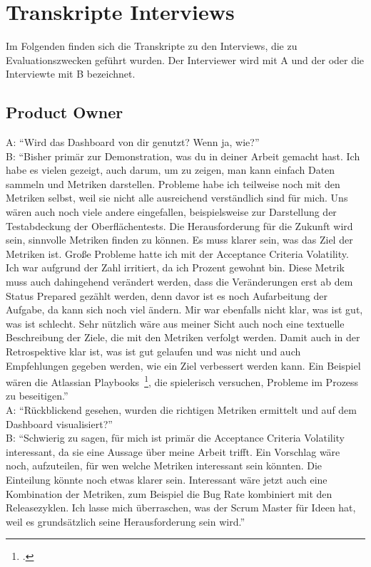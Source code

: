 \newpage
\section{Transkripte Interviews}\label{appendix:transcript}

Im Folgenden finden sich die Transkripte zu den Interviews, die zu Evaluationszwecken geführt wurden.
Der Interviewer wird mit A und der oder die Interviewte mit B bezeichnet.

\subsection{Product Owner}

A\@: ``Wird das Dashboard von dir genutzt? Wenn ja, wie?'' \\
B\@: ``Bisher primär zur Demonstration, was du in deiner Arbeit gemacht hast. Ich habe es vielen gezeigt, auch darum, um zu zeigen, man kann einfach Daten sammeln und Metriken darstellen. Probleme habe ich teilweise noch mit den Metriken selbst, weil sie nicht alle ausreichend verständlich sind für mich. Uns wären auch noch viele andere eingefallen, beispielsweise zur Darstellung der Testabdeckung der Oberflächentests. Die Herausforderung für die Zukunft wird sein, sinnvolle Metriken finden zu können. Es muss klarer sein, was das Ziel der Metriken ist. Große Probleme hatte ich mit der Acceptance Criteria Volatility. Ich war aufgrund der Zahl irritiert, da ich Prozent gewohnt bin. Diese Metrik muss auch dahingehend verändert werden, dass die Veränderungen erst ab dem Status Prepared gezählt werden, denn davor ist es noch Aufarbeitung der Aufgabe, da kann sich noch viel ändern. Mir war ebenfalls nicht klar, was ist gut, was ist schlecht. Sehr nützlich wäre aus meiner Sicht auch noch eine textuelle Beschreibung der Ziele, die mit den Metriken verfolgt werden. Damit auch in der Retrospektive klar ist, was ist gut gelaufen und was nicht und auch Empfehlungen gegeben werden, wie ein Ziel verbessert werden kann. Ein Beispiel wären die Atlassian Playbooks~\footcite{atlassian_playbook}, die spielerisch versuchen, Probleme im Prozess zu beseitigen.'' \\
A\@: ``Rückblickend gesehen, wurden die richtigen Metriken ermittelt und auf dem Dashboard visualisiert?'' \\
B\@: ``Schwierig zu sagen, für mich ist primär die Acceptance Criteria Volatility interessant, da sie eine Aussage über meine Arbeit trifft. Ein Vorschlag wäre noch, aufzuteilen, für wen welche Metriken interessant sein könnten. Die Einteilung könnte noch etwas klarer sein. Interessant wäre jetzt auch eine Kombination der Metriken, zum Beispiel die Bug Rate kombiniert mit den Releasezyklen. Ich lasse mich überraschen, was der Scrum Master für Ideen hat, weil es grundsätzlich seine Herausforderung sein wird.''

